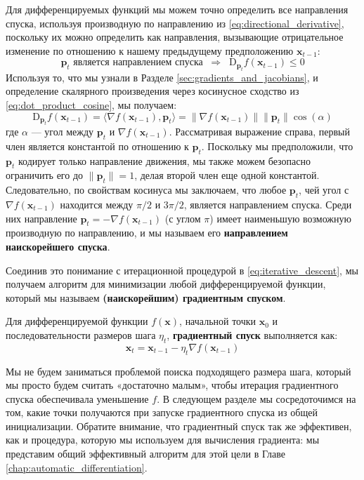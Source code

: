 Для дифференцируемых функций мы можем точно определить все направления спуска, используя производную по направлению из \eqref{eq:directional_derivative}, поскольку их можно определить как направления, вызывающие отрицательное изменение по отношению к нашему предыдущему предположению $\mathbf{x}_{t-1}$:
%
$$
\mathbf{p}_t \text{ является направлением спуска} \;\;\Rightarrow\;\; \mathrm{D}_{\mathbf{p}_t} f(\mathbf{x}_{t-1}) \le 0
$$
%
Используя то, что мы узнали в Разделе \ref{sec:gradients_and_jacobians}, и определение скалярного произведения через косинусное сходство из \eqref{eq:dot_product_cosine}, мы получаем:
%
$$
\mathrm{D}_{\mathbf{p}_t} f(\mathbf{x}_{t-1})=\langle \nabla f(\mathbf{x}_{t-1}), \mathbf{p}_t\rangle=\lVert\nabla f(\mathbf{x}_{t-1})\rVert \lVert\mathbf{p}_t\rVert \cos(\alpha)
$$
%
где $\alpha$ — угол между $\mathbf{p}_t$ и $\nabla f(\mathbf{x}_{t-1})$. Рассматривая выражение справа, первый член является константой по отношению к $\mathbf{p}_t$. Поскольку мы предположили, что $\mathbf{p}_t$ кодирует только направление движения, мы также можем безопасно ограничить его до $\lVert\mathbf{p}_t\rVert = 1$, делая второй член еще одной константой. Следовательно, по свойствам косинуса мы заключаем, что любое $\mathbf{p}_t$, чей угол с $\nabla f(\mathbf{x}_{t-1})$ находится между $\pi/2$ и $3\pi/2$, является направлением спуска. Среди них направление $\mathbf{p}_t = -\nabla f(\mathbf{x}_{t-1})$ (с углом $\pi$) имеет наименьшую возможную производную по направлению, и мы называем его \textbf{направлением наискорейшего спуска}. 

Соединив это понимание с итерационной процедурой в \eqref{eq:iterative_descent}, мы получаем алгоритм для минимизации любой дифференцируемой функции, который мы называем \textbf{(наискорейшим) градиентным спуском}.

\begin{definition} \addbottle
Для дифференцируемой функции $f(\mathbf{x})$, начальной точки $\mathbf{x}_0$ и последовательности размеров шага $\eta_t$, \textbf{градиентный спуск} выполняется как:
%
\begin{equation}
\mathbf{x}_{t}=\mathbf{x}_{t-1}-\eta_t\nabla f(\mathbf{x}_{t-1})
\label{eq:gradient_descent}
\end{equation}
\end{definition}

Мы не будем заниматься проблемой поиска подходящего размера шага, который мы просто будем считать «достаточно малым», чтобы итерация градиентного спуска обеспечивала уменьшение $f$. В следующем разделе мы сосредоточимся на том, какие точки получаются при запуске градиентного спуска из общей инициализации. Обратите внимание, что градиентный спуск так же эффективен, как и процедура, которую мы используем для вычисления градиента: мы представим общий эффективный алгоритм для этой цели в Главе \ref{chap:automatic_differentiation}.

